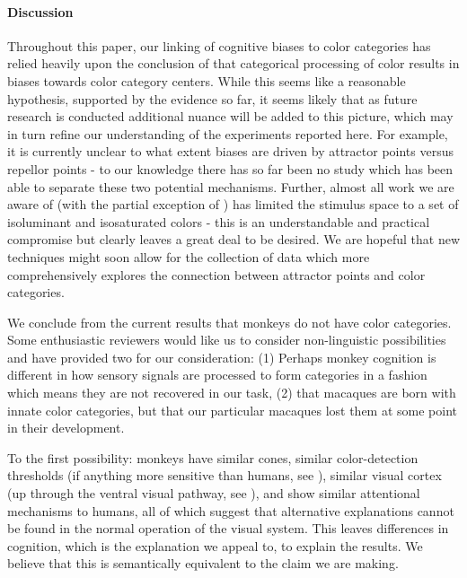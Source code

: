 \documentclass[9pt,biorxiv,lineno,onehalfspacing]{lapreprint}
\begin{document}
\begin{refsection}
\paragraph{Discussion}

Throughout this paper, our linking of cognitive biases to color categories has relied heavily upon the conclusion of \citet{bae_stimulus-specific_2014} that categorical processing of color results in biases towards color category centers.
While this seems like a reasonable hypothesis, supported by the evidence so far, it seems likely that as future research is conducted additional nuance will be added to this picture, which may in turn refine our understanding of the experiments reported here.
For example, it is currently unclear to what extent biases are driven by attractor points versus repellor points - to our knowledge there has so far been no study which has been able to separate these two potential mechanisms.
Further, almost all work we are aware of (with the partial exception of \citet{muchhala_does_2022}) has limited the stimulus space to a set of isoluminant and isosaturated colors - this is an understandable and practical compromise but clearly leaves a great deal to be desired.
We are hopeful that new techniques might soon allow for the collection of data which more comprehensively explores the connection between attractor points and color categories.

We conclude from the current results that monkeys do not have color categories.
Some enthusiastic reviewers would like us to consider non-linguistic possibilities and have provided two for our consideration: (1) Perhaps monkey cognition is different in how sensory signals are processed to form categories in a fashion which means they are not recovered in our task, (2) that macaques are born with innate color categories, but that our particular macaques lost them at some point in their development.

To the first possibility: monkeys have similar cones, similar color-detection thresholds (if anything more sensitive than humans, see \citep{gagin_color-detection_2014}), similar visual cortex (up through the ventral visual pathway, see \cite{lafer-sousa_color-biased_2016}), and show similar attentional mechanisms to humans, all of which suggest that alternative explanations cannot be found in the normal operation of the visual system. 
This leaves differences in cognition, which is the explanation we appeal to, to explain the results. 
We believe that this is semantically equivalent to the claim we are making.


\end{refsection}
\end{document}
